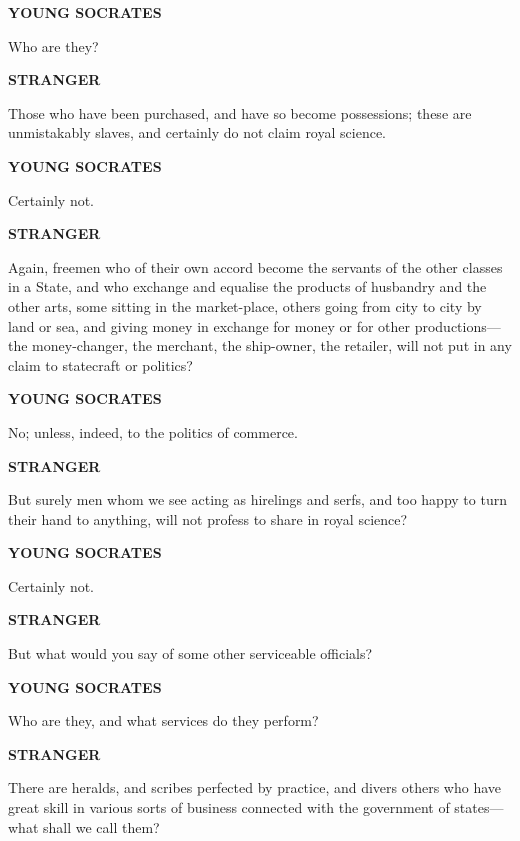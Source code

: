 \documentclass[11pt,letter]{article}
\begin{document}
\par \textbf{YOUNG SOCRATES}
\par   Who are they?

\par \textbf{STRANGER}
\par   Those who have been purchased, and have so become possessions; these are unmistakably slaves, and certainly do not claim royal science.

\par \textbf{YOUNG SOCRATES}
\par   Certainly not.

\par \textbf{STRANGER}
\par   Again, freemen who of their own accord become the servants of the other classes in a State, and who exchange and equalise the products of husbandry and the other arts, some sitting in the market-place, others going from city to city by land or sea, and giving money in exchange for money or for other productions—the money-changer, the merchant, the ship-owner, the retailer, will not put in any claim to statecraft or politics?

\par \textbf{YOUNG SOCRATES}
\par   No; unless, indeed, to the politics of commerce.

\par \textbf{STRANGER}
\par   But surely men whom we see acting as hirelings and serfs, and too happy to turn their hand to anything, will not profess to share in royal science?

\par \textbf{YOUNG SOCRATES}
\par   Certainly not.

\par \textbf{STRANGER}
\par   But what would you say of some other serviceable officials?

\par \textbf{YOUNG SOCRATES}
\par   Who are they, and what services do they perform?

\par \textbf{STRANGER}
\par   There are heralds, and scribes perfected by practice, and divers others who have great skill in various sorts of business connected with the government of states—what shall we call them?
\end{document}

